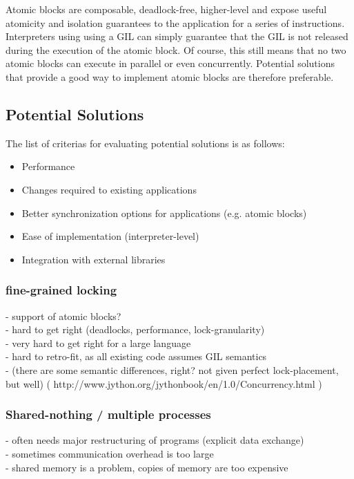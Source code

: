 \documentclass{sigplanconf}
\begin{document}
Atomic blocks are composable, deadlock-free, higher-level and expose
useful atomicity and isolation guarantees to the application for a
series of instructions.  Interpreters using using a GIL can simply
guarantee that the GIL is not released during the execution of the
atomic block. Of course, this still means that no two atomic blocks
can execute in parallel or even concurrently. Potential solutions
that provide a good way to implement atomic blocks are therefore
preferable.



\subsection{Potential Solutions}

The list of criterias for evaluating potential solutions is as follows:
\begin{itemize}
\item Performance
\item Changes required to existing applications
\item Better synchronization options for applications (e.g. atomic blocks)
\item Ease of implementation (interpreter-level)
\item Integration with external libraries
\end{itemize}

\subsubsection*{fine-grained locking}

- support of atomic blocks?\\
- hard to get right (deadlocks, performance, lock-granularity)\\
- very hard to get right for a large language\\
- hard to retro-fit, as all existing code assumes GIL semantics\\
- (there are some semantic differences, right? not given perfect lock-placement, but well)
( http://www.jython.org/jythonbook/en/1.0/Concurrency.html )

\subsubsection*{Shared-nothing / multiple processes}

- often needs major restructuring of programs (explicit data exchange)\\
- sometimes communication overhead is too large\\
- shared memory is a problem, copies of memory are too expensive
\end{document}

